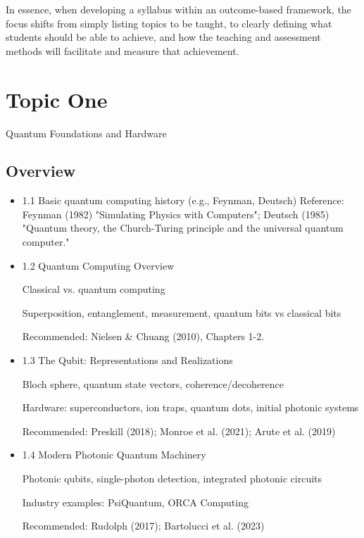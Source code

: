\documentclass[11pt,a4paper]{article}
\begin{document}
	In essence, when developing a syllabus within an outcome-based framework, the focus shifts from simply listing topics to be taught, to clearly defining what students should be able to achieve, and how the teaching and assessment methods will facilitate and measure that achievement.
	
\section{Topic One}

Quantum Foundations and Hardware

\subsection{Overview}

	\begin{itemize} 

	\item 1.1 Basic quantum computing history (e.g., Feynman, Deutsch)
Reference: Feynman (1982) "Simulating Physics with Computers"; Deutsch (1985) "Quantum theory, the Church-Turing principle and the universal quantum computer."

	\item 1.2 Quantum Computing Overview

	Classical vs. quantum computing
	
	Superposition, entanglement, measurement, quantum bits vs classical bits
	
	Recommended: Nielsen \& Chuang (2010), Chapters 1-2.

	\item 1.3 The Qubit: Representations and Realizations

	Bloch sphere, quantum state vectors, coherence/decoherence
	
	Hardware: superconductors, ion traps, quantum dots, initial photonic systems
	
	Recommended: Preskill (2018); Monroe et al. (2021); Arute et al. (2019)
	
	\item 1.4 Modern Photonic Quantum Machinery

	Photonic qubits, single-photon detection, integrated photonic circuits
	
	Industry examples: PsiQuantum, ORCA Computing
	
	Recommended: Rudolph (2017); Bartolucci et al. (2023)

\end{itemize}
\end{document}

